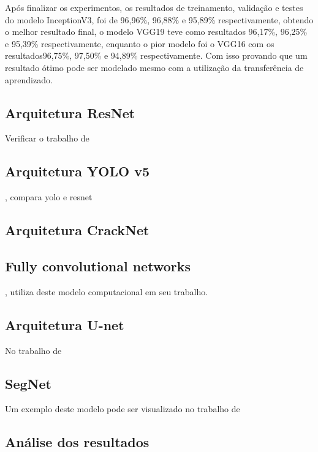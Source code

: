 Após finalizar os experimentos, os resultados de treinamento, validação e testes do modelo InceptionV3, foi de 96,96\%, 96,88\% e 95,89\% respectivamente, obtendo o melhor resultado final, o modelo VGG19 teve como resultados 96,17\%, 96,25\% e 95,39\% respectivamente, enquanto o pior modelo foi o VGG16 com os resultados96,75\%,  97,50\% e 94,89\% respectivamente.
Com isso provando que um resultado ótimo pode ser modelado mesmo com a utilização da transferência de aprendizado.


\subsection{Arquitetura ResNet}


Verificar o trabalho de 

\subsection{Arquitetura YOLO v5}



, compara yolo e resnet

\subsection{Arquitetura CrackNet}





\subsection{Fully convolutional networks}


, utiliza deste modelo computacional em seu trabalho.



\subsection{Arquitetura U-net}


No trabalho de 

\subsection{SegNet}



Um exemplo deste modelo pode ser visualizado no trabalho de 


\subsection{Análise dos resultados}